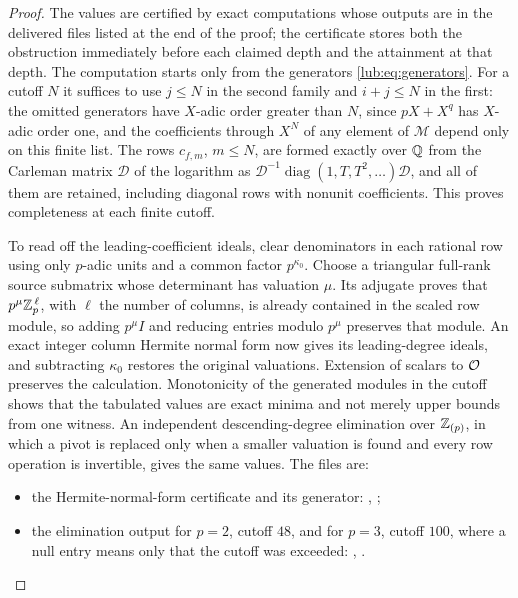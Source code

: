 \begin{proof}
The values are certified by exact computations whose outputs are in the delivered files
listed at the end of the proof; the certificate stores both the obstruction immediately
before each claimed depth and the attainment at that depth. The computation starts only
from the generators \eqref{lub:eq:generators}. For a cutoff $N$ it suffices to use
$j\le N$ in the second family and $i+j\le N$ in the first: the omitted generators have
$X$-adic order greater than $N$, since $pX+X^q$ has $X$-adic order one, and the
coefficients through $X^N$ of any element of $\mathcal M$ depend only on this finite list.
The rows $c_{f,m}$, $m\le N$, are formed exactly over $\mathbb{Q}$ from the Carleman matrix
$\mathcal D$ of the logarithm as
$\mathcal D^{-1}\operatorname{diag}(1,T,T^2,\dots)\mathcal D$, and all of them are
retained, including diagonal rows with nonunit coefficients. This proves completeness at
each finite cutoff.

To read off the leading-coefficient ideals, clear denominators in each rational row using
only $p$-adic units and a common factor $p^{\kappa_0}$. Choose a triangular full-rank
source submatrix whose determinant has valuation $\mu$. Its adjugate proves that
$p^{\mu}\mathbb{Z}_p^{\,\ell}$, with $\ell$ the number of columns, is already contained in the
scaled row module, so adding $p^{\mu}I$ and reducing entries modulo $p^{\mu}$ preserves
that module. An exact integer column Hermite normal form now gives its leading-degree
ideals, and subtracting $\kappa_0$ restores the original valuations. Extension of scalars
to $\mathcal{O}$ preserves the calculation. Monotonicity of the generated modules in the cutoff
shows that the tabulated values are exact minima and not merely upper bounds from one
witness. An independent descending-degree elimination over $\mathbb{Z}_{(p)}$, in which a pivot is
replaced only when a smaller valuation is found and every row operation is invertible,
gives the same values. The files are:
\begin{itemize}[nosep]
\raggedright
\item the Hermite-normal-form certificate and its generator:
,
;
\item the elimination output for $p=2$, cutoff $48$, and for $p=3$, cutoff $100$, where a
null entry means only that the cutoff was exceeded:
,
.\qedhere
\end{itemize}
\end{proof}

